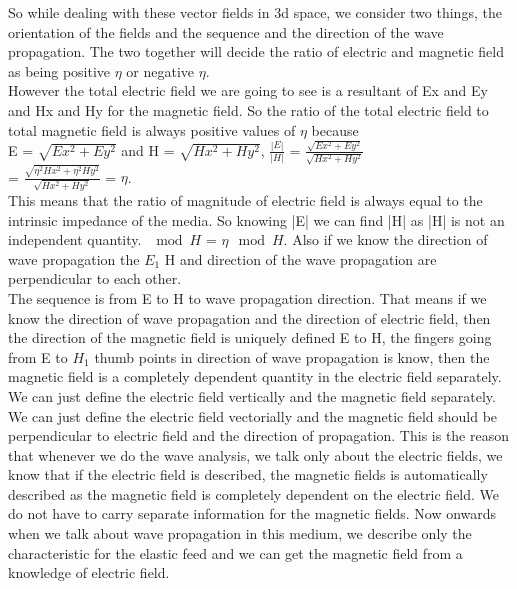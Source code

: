 So while dealing with these vector fields in 3d space, we consider two things, the orientation of the fields and the sequence and the direction of the wave propagation. The two together will decide the ratio of electric and magnetic field as being positive $\eta$ or negative $\eta$.
\\

However the total electric field we are going to see is a resultant of Ex and Ey and Hx and Hy for the magnetic field. So the ratio of the total electric field to total magnetic field is always positive values of $\eta$ because
\\

E = $\sqrt{Ex^2 + Ey^2}$ and  H = $\sqrt{Hx^2 + Hy^2}$,  $\frac{|E|}{|H|}$ = $\frac{\sqrt{Ex^2 + Ey^2}}{\sqrt{Hx^2 + Hy^2}}$
\\

= $\frac{\sqrt{\eta ^2Hx^2 + \eta ^2Hy^2}}{\sqrt{Hx^2 + Hy^2}}$ =  $\eta$.\\

This means that the ratio of magnitude of electric field is always equal to the intrinsic impedance of the media. So knowing |E| we can find |H| as |H| is not an independent quantity. $\mod H$ = $\eta\mod H$. Also if we know the direction of wave propagation the $E_{1}$ H and direction of the wave propagation are perpendicular to each other.
\\

The sequence is from E to H to wave propagation direction. That means if we know the direction of wave propagation and the direction of electric field, then the direction of the magnetic field is uniquely defined E to H, the fingers going from E to $H_{1}$ thumb points in direction of wave propagation is know, then the magnetic field is a completely dependent quantity in the electric field separately. We can just define the electric field vertically and the magnetic field separately. We can just define the electric field vectorially and the magnetic field should be perpendicular to electric field and the direction of propagation. This is the reason that whenever we do the wave analysis, we talk only about the electric fields, we know that if the electric field is described, the magnetic fields is automatically described as the magnetic field is completely dependent on the electric field. We do not have to carry separate information for the magnetic fields. Now onwards when we talk about wave propagation in this medium, we describe only the characteristic for the elastic feed and we can get the magnetic field from a knowledge of electric field.
\\

